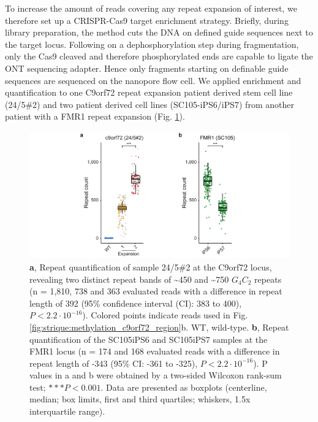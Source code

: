 To increase the amount of reads covering any repeat expansion of interest, we therefore set up a CRISPR-Cas9 target enrichment strategy. Briefly, during library preparation, the method cuts the DNA on defined guide sequences next to the target locus. Following on a dephosphorylation step during fragmentation, only the Cas9 cleaved and therefore phosphorylated ends are capable to ligate the ONT sequencing adapter. Hence only fragments starting on definable guide sequences are sequenced on the nanopore flow cell.
We applied enrichment and quantification to one C9orf72 repeat expansion patient derived stem cell line (24/5\#2) and two patient derived cell lines (SC105-iPS6/iPS7) from another patient with a FMR1 repeat expansion (Fig. \ref{fig:strique:count_patients}).


\begin{figure}[h]
    \centering
    \includegraphics[width=1.0\textwidth]{figures/strique/count_patient_samples.pdf}
    \captionsetup{format=plain}
    \caption[Repeat quantification in C9orf72 and FMR1 patients]{\textbf{a}, Repeat quantification of sample 24/5\#2 at the C9orf72 locus, revealing two distinct repeat bands of \textasciitilde450 and \textasciitilde750 $ G_{4}C_{2} $ repeats (n = 1,810, 738 and 363 evaluated reads with a difference in repeat length of 392 (95\% confidence interval (CI): 383 to 400), $ P < 2.2 \cdot 10^{-16} $). Colored points indicate reads used in Fig. \ref{fig:strique:methylation_c9orf72_region}b. WT, wild-type. \textbf{b}, Repeat quantification of the SC105iPS6 and SC105iPS7 samples at the FMR1 locus (n = 174 and 168 evaluated reads with a difference in repeat length of -343 (95\% CI: -361 to -325), $ P < 2.2 \cdot 10^{-16} $). P values in a and b were obtained by a two-sided Wilcoxon rank-sum test; $ ***P < 0.001 $. Data are presented as boxplots (centerline, median; box limits, first and third quartiles; whiskers, 1.5x interquartile range).}
    \label{fig:strique:count_patients}
\end{figure}


